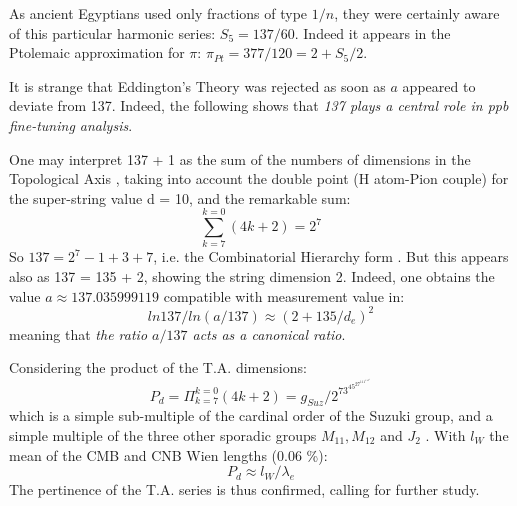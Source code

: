 \documentclass[twoside,draft]{article}
\begin{document}
\begin{sloppypar}
As ancient Egyptians used only fractions of type $1/n$, they were certainly aware of this particular harmonic series: 
$S_{5} = 137/60$. Indeed it appears in the Ptolemaic approximation for $\pi$: $\pi_{Pt} = 377/120 = 2 +  S_{5}/2$.

It is strange that Eddington's Theory was rejected as soon as $a$ appeared to deviate from 137. Indeed, the
following shows that \textit{137 plays a central role in ppb fine-tuning analysis}. 


One may interpret 137 + 1 as
the sum of the numbers of dimensions in the Topological Axis \cite{Sanchez1}, taking into account the double
point (H atom-Pion couple) for the super-string value d = 10, and the remarkable sum:
\begin{equation}
\sum_{k=7}^{k=0}(4 k + 2) = 2^{7}
\end{equation}
So $137 = 2^{7} - 1 + 3 + 7$, i.e. the Combinatorial Hierarchy form \cite{Sanchez1}. But this appears also as 137 = 135 + 2, showing the string dimension 2. Indeed, one obtains the value $a \approx 137.035999119$
compatible with measurement value in:
\begin{equation}
ln137/ln(a/137) \approx (2+135/d_{e})^{2}
\end{equation}
meaning that \textit{the ratio $a/137$ acts as a canonical ratio}. 

Considering the product of the T.A. dimensions:
\begin{equation}
P_d = \Pi_{k=7}^{k=0}(4 k + 2) = g_{Suz}/2^73^45^27^111^113^1
\end{equation}
which is a simple sub-multiple of the cardinal order of the Suzuki group, and a simple multiple of the three other sporadic groups $M_{11}, M_{12}$ and $J_2$ \cite{Aschbacher}.
With $l_W$ the mean of the CMB and CNB Wien lengths (0.06 \%):
\begin{equation}
P_d \approx l_W / \lambda_e
\end{equation}
The pertinence of the T.A. series is thus confirmed, calling for further study.


\end{sloppypar}
\end{document}
